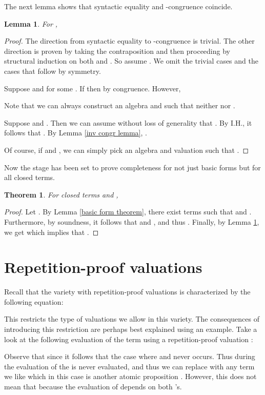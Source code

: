 \documentclass[a4paper,twoside,openright]{report}
\newtheorem{lem}[theorem]{Lemma}
\newtheorem{thm}[theorem]{Theorem}
\begin{document}
The next lemma shows that syntactic equality and -congruence coincide.
\begin{lem}\label{completeness lemma}
For ,

\end{lem}
\begin{proof}
The direction from syntactic equality to -congruence is trivial. The other direction is proven by taking the contraposition and then proceeding by structural induction on both  and . So assume . We omit the trivial cases and the cases that follow by symmetry. 

Suppose  and  for some . If  then  by congruence. However,

Note that we can always construct an algebra  and  such that neither  nor .

Suppose  and . Then we can assume without loss of generality that . By I.H., it follows that . By Lemma \ref{inv congr lemma}, .

Of course, if  and , we can simply pick an algebra  and valuation  such that .
\end{proof}

Now the stage has been set to prove completeness for not just basic forms but for all closed terms.

\begin{thm}\label{completeness thm}
For closed terms  and ,

\end{thm}
\begin{proof}
Let . By Lemma \ref{basic form theorem}, there exist
terms  such that  and .
Furthermore, by soundness, it follows that  and , and
thus . Finally, by Lemma \ref{completeness lemma}, we get
 which implies that .
\end{proof}

\section{Repetition-proof valuations}
Recall that the variety with repetition-proof valuations is characterized by the following equation:

This restricts the type of valuations we allow in this variety. The consequences of introducing this restriction are perhaps best explained using an example. Take a look at the following evaluation of the term  using a repetition-proof valuation :

Observe that since  it follows that the case where  and  never occurs. Thus during the evaluation of  the  is never evaluated, and thus we can replace  with any term we like which in this case is another atomic proposition . However, this does not mean that  because the evaluation of  depends on both 's.
\end{document}

